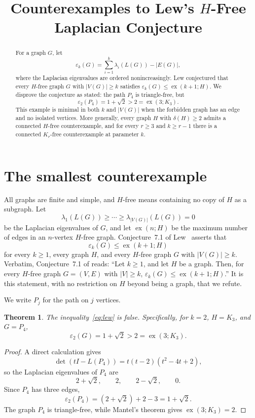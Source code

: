 \documentclass[11pt]{amsart}
\title[Counterexamples to Lew's conjecture]
{Counterexamples to Lew's
\texorpdfstring{$H$}{H}-Free Laplacian Conjecture}
\date{}
\newtheorem{theorem}{Theorem}
\theoremstyle{remark}
\newcommand{\eps}{\varepsilon}
\newcommand{\ex}{\operatorname{ex}}
\begin{document}
\begin{abstract}
For a graph $G$, let
\[
\eps_k(G)=\sum_{i=1}^k\lambda_i(L(G))-|E(G)|,
\]
where the Laplacian eigenvalues are ordered nonincreasingly. Lew conjectured
that every $H$-free graph $G$ with $|V(G)|\ge k$ satisfies
$\eps_k(G)\le \ex(k+1;H)$. We disprove the conjecture as stated: the path
$P_4$ is triangle-free, but
\[
\eps_2(P_4)=1+\sqrt2>2=\ex(3;K_3).
\]
This example is minimal in both $k$ and $|V(G)|$ when the forbidden graph has
an edge and no isolated vertices. More generally, every graph $H$ with
$\delta(H)\ge2$ admits a connected $H$-free counterexample, and for every
$r\ge3$ and $k\ge r-1$ there is a connected $K_r$-free counterexample at
parameter $k$.
\end{abstract}

\maketitle

\section{The smallest counterexample}

All graphs are finite and simple, and $H$-free means containing no copy of
$H$ as a subgraph. Let
\[
\lambda_1(L(G))\ge\cdots\ge\lambda_{|V(G)|}(L(G))=0
\]
be the Laplacian eigenvalues of $G$, and let $\ex(n;H)$ be the maximum number
of edges in an $n$-vertex $H$-free graph. Conjecture~7.1 of
Lew~\cite{Lew} asserts that
\begin{equation}\label{eq:lew}
  \eps_k(G)\le \ex(k+1;H)
\end{equation}
for every $k\ge1$, every graph $H$, and every $H$-free graph $G$ with
$|V(G)|\ge k$. Verbatim, Conjecture~7.1 of \cite{Lew} reads: ``Let $k\ge1$, and
let $H$ be a graph. Then, for every $H$-free graph $G=(V,E)$ with $|V|\ge k$,
$\eps_k(G)\le\ex(k+1;H)$.'' It is this statement, with no restriction on $H$
beyond being a graph, that we refute.

We write $P_j$ for the path on $j$ vertices.

\begin{theorem}\label{thm:p4}
The inequality~\eqref{eq:lew} is false. Specifically, for $k=2$, $H=K_3$,
and $G=P_4$,
\[
  \eps_2(G)=1+\sqrt2>2=\ex(3;K_3).
\]
\end{theorem}

\begin{proof}
A direct calculation gives
\[
\det(tI-L(P_4))=t(t-2)(t^2-4t+2),
\]
so the Laplacian eigenvalues of $P_4$ are
\[
2+\sqrt2,\qquad 2,\qquad 2-\sqrt2,\qquad 0.
\]
Since $P_4$ has three edges,
\[
\eps_2(P_4)=(2+\sqrt2)+2-3=1+\sqrt2.
\]
The graph $P_4$ is triangle-free, while Mantel's theorem gives
$\ex(3;K_3)=2$.
\end{proof}
\end{document}
